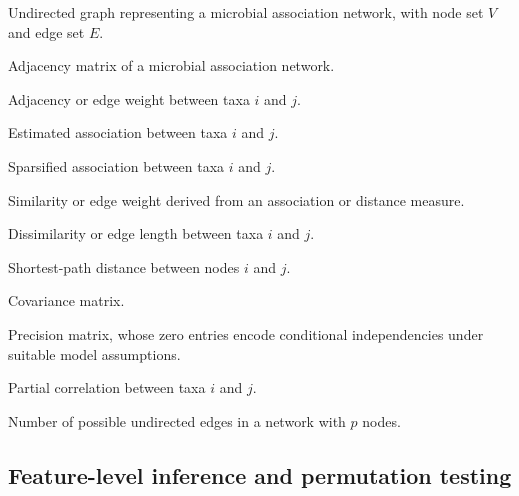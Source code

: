 \notationsettings{2.8cm}
\begin{notationlist}
	\item[$\mathcal{G} = (V,E)$] Undirected graph representing a microbial association network, with node set $V$ and edge set $E$.
	
	\item[$\mathbf{A} = (a_{ij})$] Adjacency matrix of a microbial association network.
	
	\item[$a_{ij}$] Adjacency or edge weight between taxa $i$ and $j$.
	
	\item[$r_{ij}$] Estimated association between taxa $i$ and $j$.
	
	\item[$r_{ij}^\ast$] Sparsified association between taxa $i$ and $j$.
	
	\item[$s_{ij}$] Similarity or edge weight derived from an association or distance measure.
	
	\item[$d_{ij}$] Dissimilarity or edge length between taxa $i$ and $j$.
	
	\item[$\delta_{ij}$] Shortest-path distance between nodes $i$ and $j$.
	
	\item[$\boldsymbol{\Sigma}$] Covariance matrix.
	
	\item[$\boldsymbol{\Omega} = \boldsymbol{\Sigma}^{-1}$] Precision matrix, whose zero entries encode conditional independencies under suitable model assumptions.
	
	\item[$\tilde{\rho}_{ij}$] Partial correlation between taxa $i$ and $j$.
	
	\item[$M = p(p-1)/2$] Number of possible undirected edges in a network with $p$ nodes.
\end{notationlist}

\subsection*{Feature-level inference and permutation testing}

